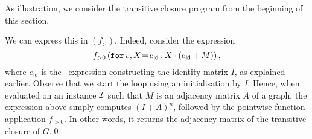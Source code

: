 As illustration, we consider the transitive closure program from the beginning of this section.
\begin{example}
 We can
express this in \langfor$(f_>)$. Indeed, consider the expression 
$$
f_{>0}\left(\initf{e_{\mathsf{Id}}}{v}{X}{X\cdot (e_{\mathsf{Id}}+M)}\right),
$$
where $e_{\mathsf{Id}}$ is the \langfor\ expression constructing the identity matrix $I$, as explained earlier.
Observe that we start the loop using an initialisation by $I$. Hence, when evaluated on an instance $\I$ such that $M$ is an adjacency matrix $A$ of a graph, the expression above simply computes $(I+A)^n$, followed by the pointwise function application $f_{>0}$. In other words, it returns the adjacency matrix of the transitive closure of $G$.\qed
\end{example}
%



